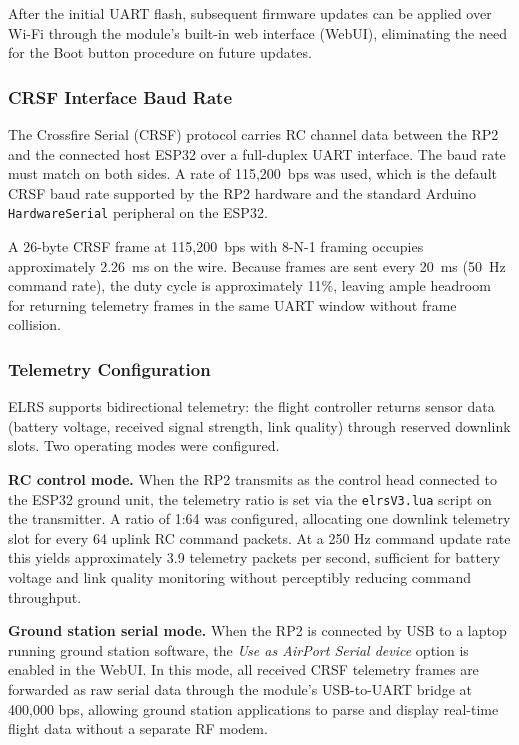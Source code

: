 After the initial UART flash, subsequent firmware updates can be applied over Wi-Fi through the
module's built-in web interface (WebUI), eliminating the need for the Boot button procedure on
future updates.

\subsubsection{CRSF Interface Baud Rate}
\label{subsubsec:crsf}

The Crossfire Serial (CRSF) protocol carries RC channel data between the RP2 and the connected
host ESP32 over a full-duplex UART interface.
The baud rate must match on both sides.
A rate of 115,200~bps was used, which is the default CRSF baud rate supported by the RP2
hardware and the standard Arduino \texttt{HardwareSerial} peripheral on the ESP32.

A 26-byte CRSF frame at 115,200~bps with 8-N-1 framing occupies approximately 2.26~ms on
the wire.
Because frames are sent every 20~ms (50~Hz command rate), the duty cycle is approximately
11\%, leaving ample headroom for returning telemetry frames in the same UART window without
frame collision.

\subsubsection{Telemetry Configuration}
\label{subsubsec:telemetry}

ELRS supports bidirectional telemetry: the flight controller returns sensor data
(battery voltage, received signal strength, link quality) through reserved downlink slots.
Two operating modes were configured.

\textbf{RC control mode.}
When the RP2 transmits as the control head connected to the ESP32 ground unit, the telemetry ratio is
set via the \texttt{elrsV3.lua} script on the transmitter.
A ratio of 1:64 was configured, allocating one downlink telemetry slot for every 64 uplink RC
command packets.
At a 250 Hz command update rate this yields approximately 3.9 telemetry packets per second,
sufficient for battery voltage and link quality monitoring without perceptibly reducing command
throughput.

\textbf{Ground station serial mode.}
When the RP2 is connected by USB to a laptop running ground station software, the
\emph{Use as AirPort Serial device} option is enabled in the WebUI.
In this mode, all received CRSF telemetry frames are forwarded as raw serial data through the
module's USB-to-UART bridge at 400,000 bps, allowing ground station applications to parse and
display real-time flight data without a separate RF modem.

